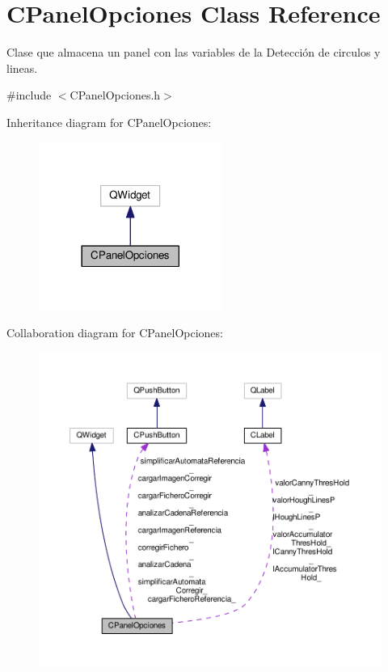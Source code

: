 \hypertarget{classCPanelOpciones}{}\section{C\+Panel\+Opciones Class Reference}
\label{classCPanelOpciones}


Clase que almacena un panel con las variables de la Detección de circulos y lineas.  




{\ttfamily \#include $<$C\+Panel\+Opciones.\+h$>$}



Inheritance diagram for C\+Panel\+Opciones\+:\nopagebreak
\begin{figure}[H]
\begin{center}
\leavevmode
\includegraphics[width=170pt]{classCPanelOpciones__inherit__graph}
\end{center}
\end{figure}


Collaboration diagram for C\+Panel\+Opciones\+:
\nopagebreak
\begin{figure}[H]
\begin{center}
\leavevmode
\includegraphics[width=350pt]{classCPanelOpciones__coll__graph}
\end{center}
\end{figure}
